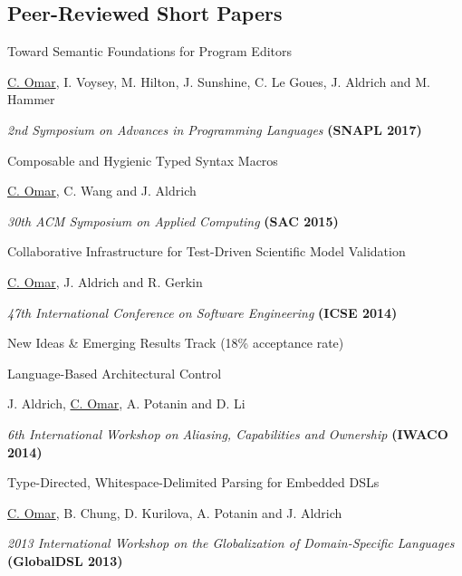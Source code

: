 \documentclass[10pt,letterpaper]{article}
\renewenvironment{itemize}{
  \begin{list}{}{
    \setlength{\leftmargin}{1.25em}
    \setlength{\itemsep}{0.25em}
    \setlength{\parskip}{0pt}
    \setlength{\parsep}{0.2em}
  }
}{
  \end{list}
}
\begin{document}
\subsection*{Peer-Reviewed Short Papers}

\begin{enumerate}[resume]
\item Toward Semantic Foundations for Program Editors
  \begin{itemize}
    \item \underline{C. Omar}, I. Voysey, M. Hilton, J. Sunshine, C. Le Goues, J. Aldrich and M. Hammer
    \item \textit{2nd Symposium on Advances in Programming Languages} {\textbf{(SNAPL 2017)}}
  \end{itemize}
\item Composable and Hygienic Typed Syntax Macros
  \begin{itemize}
    \item \underline{C. Omar}, C. Wang and J. Aldrich
    \item \textit{30th ACM Symposium on Applied Computing} {\textbf{(SAC 2015)}}
  \end{itemize}
\item Collaborative Infrastructure for Test-Driven Scientific Model Validation
  \begin{itemize}
    \item \underline{C. Omar}, J. Aldrich and R. Gerkin
    \item \textit{47th International Conference on Software Engineering} {\textbf{(ICSE 2014)}}
    \item New Ideas \& Emerging Results Track (18\% acceptance rate)
  \end{itemize}
\item Language-Based Architectural Control
  \begin{itemize}
    \item J. Aldrich, \underline{C. Omar}, A. Potanin and D. Li
    \item \textit{6th International Workshop on Aliasing, Capabilities and Ownership} {\textbf{(IWACO 2014)}}
  \end{itemize}
\item Type-Directed, Whitespace-Delimited Parsing for Embedded DSLs
  \begin{itemize}
    \item \underline{C. Omar}, B. Chung, D. Kurilova, A. Potanin and J. Aldrich
    \item \textit{2013 International Workshop on the Globalization of Domain-Specific Languages} {\textbf{(GlobalDSL 2013)}}

\end{itemize}
\end{enumerate}
\end{document}
